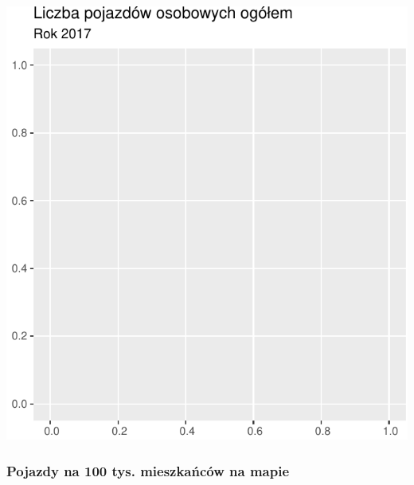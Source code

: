 \documentclass[
]{article}
\begin{document}
\begin{flushleft}\includegraphics{raport_wypadki_files/figure-latex/pojazdy-1} \end{flushleft}

\hypertarget{pojazdy-na-100-tys.-mieszkaux144cuxf3w-na-mapie}{%
\subsubsection{Pojazdy na 100 tys. mieszkańców na
mapie}\label{pojazdy-na-100-tys.-mieszkaux144cuxf3w-na-mapie}}
\end{document}
